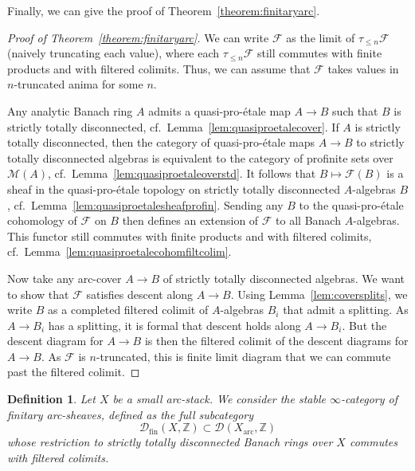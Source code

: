 \documentclass[11pt]{amsart}
\numberwithin{equation}{section}
\numberwithin{theorem}{section}
\newtheorem{definition}[theorem]{Definition}
\theoremstyle{definition}
\begin{document}
Finally, we can give the proof of Theorem~\ref{theorem:finitaryarc}.

\begin{proof}[Proof of Theorem~\ref{theorem:finitaryarc}] We can write $\mathcal F$ as the limit of $\tau_{\leq n} \mathcal F$ (naively truncating each value), where each $\tau_{\leq n} \mathcal F$ still commutes with finite products and with filtered colimits. Thus, we can assume that $\mathcal F$ takes values in $n$-truncated anima for some $n$.

Any analytic Banach ring $A$ admits a quasi-pro-\'etale map $A\to B$ such that $B$ is strictly totally disconnected, cf.~Lemma~\ref{lem:quasiproetalecover}. If $A$ is strictly totally disconnected, then the category of quasi-pro-\'etale maps $A\to B$ to strictly totally disconnected algebras is equivalent to the category of profinite sets over $\mathcal M(A)$, cf.~Lemma~\ref{lem:quasiproetaleoverstd}. It follows that $B\mapsto\mathcal F(B)$ is a sheaf in the quasi-pro-\'etale topology on strictly totally disconnected $A$-algebras $B$, cf.~Lemma~\ref{lem:quasiproetalesheafprofin}. Sending any $B$ to the quasi-pro-\'etale cohomology of $\mathcal F$ on $B$ then defines an extension of $\mathcal F$ to all Banach $A$-algebras. This functor still commutes with finite products and with filtered colimits, cf.~Lemma~\ref{lem:quasiproetalecohomfiltcolim}.

Now take any arc-cover $A\to B$ of strictly totally disconnected algebras. We want to show that $\mathcal F$ satisfies descent along $A\to B$. Using Lemma~\ref{lem:coversplits}, we write $B$ as a completed filtered colimit of $A$-algebras $B_i$ that admit a splitting. As $A\to B_i$ has a splitting, it is formal that descent holds along $A\to B_i$. But the descent diagram for $A\to B$ is then the filtered colimit of the descent diagrams for $A\to B$. As $\mathcal F$ is $n$-truncated, this is finite limit diagram that we can commute past the filtered colimit.
\end{proof}

\begin{definition} Let $X$ be a small arc-stack. We consider the stable $\infty$-category of finitary arc-sheaves, defined as the full subcategory
\[
\mathcal D_{\mathrm{fin}}(X,\mathbb Z)\subset \mathcal D(X_{\mathrm{arc}},\mathbb Z)
\]
whose restriction to strictly totally disconnected Banach rings over $X$ commutes with filtered colimits.
\end{definition}
\end{document}
